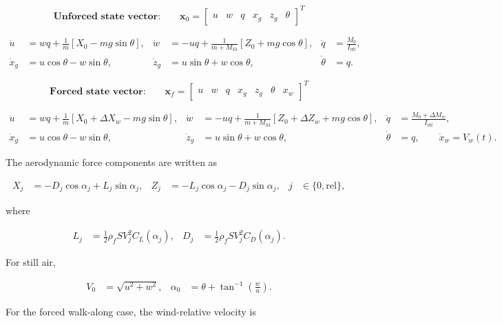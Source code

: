 \documentclass[10pt]{article}
\begin{document}
\begingroup
\small
\setlength{\jot}{3pt}

\[
\textbf{Unforced state vector:}
\qquad
\mathbf{x}_0 =
\begin{bmatrix}
u & w & q & x_g & z_g & \theta
\end{bmatrix}^{T}
\]

\begin{align}
\dot{u} &= wq + \frac{1}{m}\left[X_0 - mg\sin\theta\right],
&
\dot{w} &= -uq + \frac{1}{m+M_{33}}\left[Z_0 + mg\cos\theta\right],
&
\dot{q} &= \frac{M_0}{I_{\mathrm{eff}}}, \\
\dot{x}_g &= u\cos\theta - w\sin\theta,
&
\dot{z}_g &= u\sin\theta + w\cos\theta,
&
\dot{\theta} &= q.
\end{align}

\[
\textbf{Forced state vector:}
\qquad
\mathbf{x}_f =
\begin{bmatrix}
u & w & q & x_g & z_g & \theta & x_w
\end{bmatrix}^{T}
\]

\begin{align}
\dot{u} &= wq + \frac{1}{m}\left[X_0+\Delta X_w - mg\sin\theta\right],
&
\dot{w} &= -uq + \frac{1}{m+M_{33}}\left[Z_0+\Delta Z_w + mg\cos\theta\right],
&
\dot{q} &= \frac{M_0+\Delta M_w}{I_{\mathrm{eff}}}, \\
\dot{x}_g &= u\cos\theta - w\sin\theta,
&
\dot{z}_g &= u\sin\theta + w\cos\theta,
&
\dot{\theta} &= q,
\qquad
\dot{x}_w = V_w(t).
\end{align}

The aerodynamic force components are written as

\begin{align}
X_j &= -D_j\cos\alpha_j + L_j\sin\alpha_j,
&
Z_j &= -L_j\cos\alpha_j - D_j\sin\alpha_j,
&
j &\in \{0,\mathrm{rel}\},
\end{align}

where

\begin{align}
L_j &= \frac{1}{2}\rho_f S V_j^2 C_L(\alpha_j),
&
D_j &= \frac{1}{2}\rho_f S V_j^2 C_D(\alpha_j).
\end{align}

For still air,

\begin{align}
V_0 &= \sqrt{u^2+w^2},
&
\alpha_0 &= \theta + \tan^{-1}\left(\frac{w}{u}\right).
\end{align}

For the forced walk-along case, the wind-relative velocity is
\end{document}
